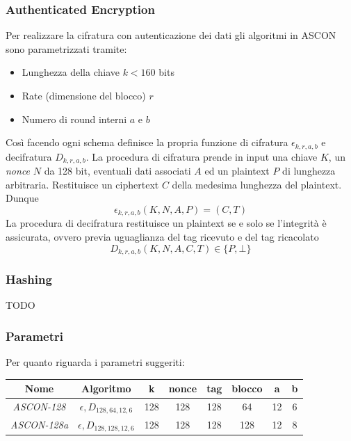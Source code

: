 \subsubsection{Authenticated Encryption}
Per realizzare la cifratura con autenticazione dei dati gli algoritmi in ASCON sono parametrizzati tramite:
\begin{itemize}
    \item Lunghezza della chiave $k < 160$ bits
    \item Rate (dimensione del blocco) $r$
    \item Numero di round interni $a$ e $b$
\end{itemize}
Così facendo ogni schema definisce la propria funzione di cifratura $\epsilon_{k, r, a, b}$ e decifratura $D_{k, r, a, b}$. La procedura di cifratura prende in input una chiave $K$, un \textsl{nonce} $N$ da 128 bit, eventuali dati associati $A$ ed un plaintext $P$ di lunghezza arbitraria. Restituisce un ciphertext $C$ della medesima lunghezza del plaintext. Dunque
\[\epsilon_{k,r,a,b}(K,N,A,P)=(C,T)\]
La procedura di decifratura restituisce un plaintext se e solo se l'integrità è assicurata, ovvero previa uguaglianza del tag ricevuto e del tag ricacolato
\[D_{k,r,a,b}(K,N,A,C,T)\in\{P, \bot\}\]
\subsubsection{Hashing}
TODO

\subsubsection{Parametri}
Per quanto riguarda i parametri suggeriti:
\begin{table}[h!]
    \centering
    \begin{tabular}{|c|c|c|c|c|c|c|c|}
        \hline
        \textbf{Nome}       & \textbf{Algoritmo}            & \textbf{k} & \textbf{nonce} & \textbf{tag} & \textbf{blocco} & \textbf{a} & \textbf{b} \\
        \hline
        \textsl{ASCON-128}  & $\epsilon, D_{128, 64,12,6}$  & 128        & 128            & 128          & 64              & 12         & 6          \\
        \hline
        \textsl{ASCON-128a} & $\epsilon, D_{128, 128,12,6}$ & 128        & 128            & 128          & 128             & 12         & 8          \\
        \hline
    \end{tabular}
\end{table}

